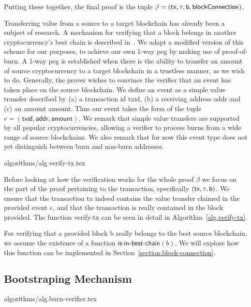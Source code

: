 Putting these together, the final proof is the tuple $\beta = \sf(tx, \tau, b, block\-Connection)$.

Transferring value from a source to a target blockchain has already been a subject of research. A mechanism for verifying that a block belongs in another cryptocurrency's best chain is described in~\cite{pow-sidechains}. We adapt a modified version of this scheme for our purposes, to achieve our own 1-way peg by making use of proof-of-burn. A 1-way peg is established when there is the ability to transfer an amount of source cryptocurrency to a target blockchain in a trustless manner, as we wish to do. Generally, the prover wishes to convince the verifier that an event has taken place on the source blockchain. We define an event as a simple value transfer described by (a) a transaction id \textsf{txid}, (b) a receiving address \textsf{addr} and (c) an amount \textsf{amount}. Thus our event takes the form of the tuple $e = (\textsf{txid}, \textsf{addr}, \textsf{amount})$. We remark that simple value transfers are supported by all popular cryptocurrencies, allowing a verifier to process burns from a wide range of source blockchains. We also remark that for now this event type does not yet distinguish between burn and non-burn addresses.

{algorithms/alg.verify-tx.tex}

Before looking at how the verification works for the whole proof $\beta$ we focus on the part of the proof pertaining to the transaction, specifically $\sf(tx, \tau, b)$. We ensure that the transaction \textsf{tx} indeed contains the value transfer claimed in the provided event $e$, and that the transaction is really contained in the block provided. The function \textsf{verify-tx} can be seen in detail in Algorithm~\ref{alg.verify-tx}.

For verifying that a provided block \textsf{b} really belongs to the best source blockchain, we assume the existence of a function $\textsf{is-in-best-chain}(b)$. We will explore how this function can be implemented in Section~\ref{section:block-connection}.

\subsection{Bootstraping Mechanism}
{algorithms/alg.burn-verifier.tex}

